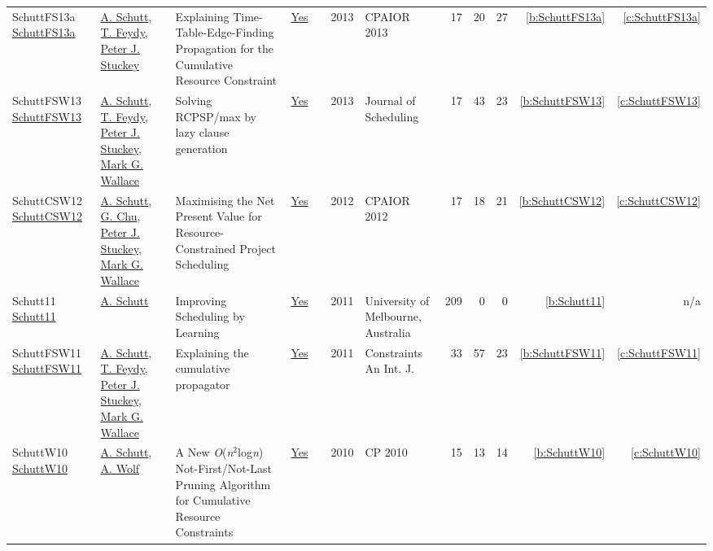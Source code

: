 {\begin{longtable}{>{\raggedright\arraybackslash}p{3cm}>{\raggedright\arraybackslash}p{6cm}>{\raggedright\arraybackslash}p{6.5cm}rrrp{2.5cm}rrrrr}
SchuttFS13a \href{https://doi.org/10.1007/978-3-642-38171-3\_16}{SchuttFS13a} & \hyperref[auth:a125]{A. Schutt}, \hyperref[auth:a155]{T. Feydy}, \hyperref[auth:a126]{Peter J. Stuckey} & Explaining Time-Table-Edge-Finding Propagation for the Cumulative Resource Constraint & \href{works/SchuttFS13a.pdf}{Yes} & \cite{SchuttFS13a} & 2013 & CPAIOR 2013 & 17 & 20 & 27 & \ref{b:SchuttFS13a} & \ref{c:SchuttFS13a}\\
SchuttFSW13 \href{https://doi.org/10.1007/s10951-012-0285-x}{SchuttFSW13} & \hyperref[auth:a125]{A. Schutt}, \hyperref[auth:a155]{T. Feydy}, \hyperref[auth:a126]{Peter J. Stuckey}, \hyperref[auth:a156]{Mark G. Wallace} & Solving RCPSP/max by lazy clause generation & \href{works/SchuttFSW13.pdf}{Yes} & \cite{SchuttFSW13} & 2013 & Journal of Scheduling & 17 & 43 & 23 & \ref{b:SchuttFSW13} & \ref{c:SchuttFSW13}\\
SchuttCSW12 \href{https://doi.org/10.1007/978-3-642-29828-8\_24}{SchuttCSW12} & \hyperref[auth:a125]{A. Schutt}, \hyperref[auth:a349]{G. Chu}, \hyperref[auth:a126]{Peter J. Stuckey}, \hyperref[auth:a156]{Mark G. Wallace} & Maximising the Net Present Value for Resource-Constrained Project Scheduling & \href{works/SchuttCSW12.pdf}{Yes} & \cite{SchuttCSW12} & 2012 & CPAIOR 2012 & 17 & 18 & 21 & \ref{b:SchuttCSW12} & \ref{c:SchuttCSW12}\\
Schutt11 \href{https://www.a4cp.org/sites/default/files/andreas_schutt_-_improving_scheduling_by_learning.pdf}{Schutt11} & \hyperref[auth:a125]{A. Schutt} & Improving Scheduling by Learning & \href{works/Schutt11.pdf}{Yes} & \cite{Schutt11} & 2011 & University of Melbourne, Australia & 209 & 0 & 0 & \ref{b:Schutt11} & n/a\\
SchuttFSW11 \href{https://doi.org/10.1007/s10601-010-9103-2}{SchuttFSW11} & \hyperref[auth:a125]{A. Schutt}, \hyperref[auth:a155]{T. Feydy}, \hyperref[auth:a126]{Peter J. Stuckey}, \hyperref[auth:a156]{Mark G. Wallace} & Explaining the cumulative propagator & \href{works/SchuttFSW11.pdf}{Yes} & \cite{SchuttFSW11} & 2011 & Constraints An Int. J. & 33 & 57 & 23 & \ref{b:SchuttFSW11} & \ref{c:SchuttFSW11}\\
SchuttW10 \href{https://doi.org/10.1007/978-3-642-15396-9\_36}{SchuttW10} & \hyperref[auth:a125]{A. Schutt}, \hyperref[auth:a51]{A. Wolf} & A New \emph{O}(\emph{n}\({}^{\mbox{2}}\)log\emph{n}) Not-First/Not-Last Pruning Algorithm for Cumulative Resource Constraints & \href{works/SchuttW10.pdf}{Yes} & \cite{SchuttW10} & 2010 & CP 2010 & 15 & 13 & 14 & \ref{b:SchuttW10} & \ref{c:SchuttW10}\\

\end{longtable}}
